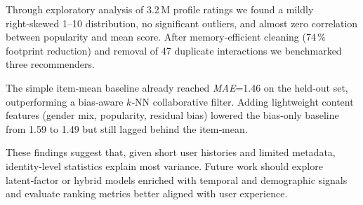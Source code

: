 Through exploratory analysis of 3.2\,M profile ratings we found a mildly right‑skewed 1--10 distribution, no significant outliers, and almost zero correlation between popularity and mean score. After memory‑efficient cleaning (74\,\% footprint reduction) and removal of 47 duplicate interactions we benchmarked three recommenders.

The simple item‑mean baseline already reached \textit{MAE}=1.46 on the held‑out set, outperforming a bias‑aware $k$‑NN collaborative filter. Adding lightweight content features (gender mix, popularity, residual bias) lowered the bias‑only baseline from 1.59 to 1.49 but still lagged behind the item‑mean.

These findings suggest that, given short user histories and limited metadata, identity‑level statistics explain most variance. Future work should explore latent‑factor or hybrid models enriched with temporal and demographic signals and evaluate ranking metrics better aligned with user experience.
